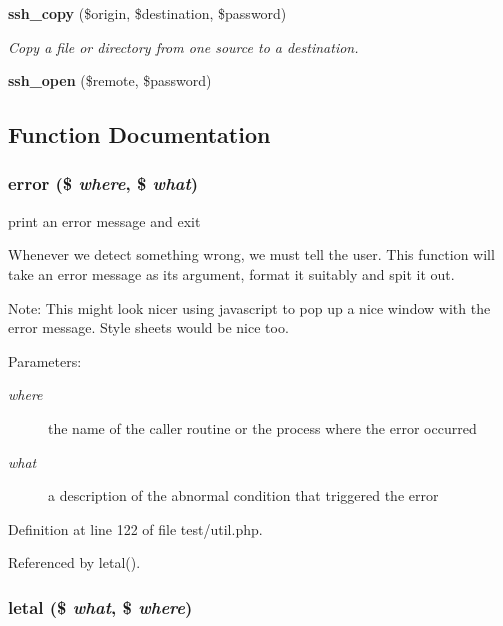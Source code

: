 \begin{CompactItemize}
{\bf ssh\_\-copy} (\$origin, \$destination, \$password)
\begin{CompactList}\small\item\em Copy a file or directory from one source to a destination. \item\end{CompactList}\item 
{\bf ssh\_\-open} (\$remote, \$password)
\end{CompactItemize}


\subsection{Function Documentation}
\subsubsection{\setlength{\rightskip}{0pt plus 5cm}error (\$ {\em where}, \$ {\em what})}\label{test_2util_8php_a3}


print an error message and exit 

Whenever we detect something wrong, we must tell the user. This function will take an error message as its argument, format it suitably and spit it out.

\begin{Desc}
\item[Note:]This might look nicer using javascript to pop up a nice window with the error message. Style sheets would be nice too.\end{Desc}
\begin{Desc}
\item[Parameters:]
\begin{description}
\item[{\em where}]the name of the caller routine or the process where the error occurred \item[{\em what}]a description of the abnormal condition that triggered the error \end{description}
\end{Desc}


Definition at line 122 of file test/util.php.

Referenced by letal().
\subsubsection{\setlength{\rightskip}{0pt plus 5cm}letal (\$ {\em what}, \$ {\em where})}\label{test_2util_8php_a4}


